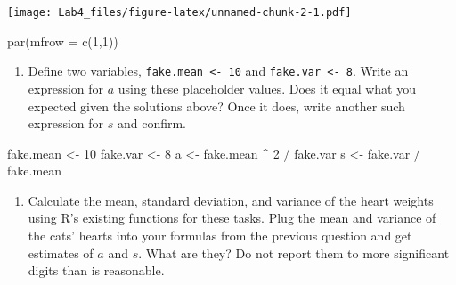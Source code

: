 \documentclass[
]{article}
\newenvironment{Shaded}{\begin{snugshade}}{\end{snugshade}}
\newcommand{\AttributeTok}[1]{\textcolor[rgb]{0.77,0.63,0.00}{#1}}
\newcommand{\DecValTok}[1]{\textcolor[rgb]{0.00,0.00,0.81}{#1}}
\newcommand{\FunctionTok}[1]{\textcolor[rgb]{0.00,0.00,0.00}{#1}}
\newcommand{\NormalTok}[1]{#1}
\newcommand{\OtherTok}[1]{\textcolor[rgb]{0.56,0.35,0.01}{#1}}
\newcommand{\SpecialCharTok}[1]{\textcolor[rgb]{0.00,0.00,0.00}{#1}}
\providecommand{\tightlist}{%
  \setlength{\itemsep}{0pt}\setlength{\parskip}{0pt}}
\begin{document}
\texttt{[image: Lab4\_files/figure-latex/unnamed-chunk-2-1.pdf]}

\begin{Shaded}
\begin{Highlighting}[]
\FunctionTok{par}\NormalTok{(}\AttributeTok{mfrow =} \FunctionTok{c}\NormalTok{(}\DecValTok{1}\NormalTok{,}\DecValTok{1}\NormalTok{))}
\end{Highlighting}
\end{Shaded}

\begin{enumerate}
\def\labelenumi{\arabic{enumi}.}
\setcounter{enumi}{2}
\tightlist
\item
  Define two variables, \texttt{fake.mean\ \textless{}-\ 10} and
  \texttt{fake.var\ \textless{}-\ 8}. Write an expression for \(a\)
  using these placeholder values. Does it equal what you expected given
  the solutions above? Once it does, write another such expression for
  \(s\) and confirm.
\end{enumerate}

\begin{Shaded}
\begin{Highlighting}[]
\NormalTok{fake.mean }\OtherTok{\textless{}{-}} \DecValTok{10}
\NormalTok{fake.var }\OtherTok{\textless{}{-}} \DecValTok{8}
\NormalTok{a }\OtherTok{\textless{}{-}}\NormalTok{ fake.mean }\SpecialCharTok{\^{}} \DecValTok{2} \SpecialCharTok{/}\NormalTok{ fake.var}
\NormalTok{s }\OtherTok{\textless{}{-}}\NormalTok{ fake.var }\SpecialCharTok{/}\NormalTok{ fake.mean}
\end{Highlighting}
\end{Shaded}

\begin{enumerate}
\def\labelenumi{\arabic{enumi}.}
\setcounter{enumi}{3}
\tightlist
\item
  Calculate the mean, standard deviation, and variance of the heart
  weights using R's existing functions for these tasks. Plug the mean
  and variance of the cats' hearts into your formulas from the previous
  question and get estimates of \(a\) and \(s\). What are they? Do not
  report them to more significant digits than is reasonable.
\end{enumerate}

\begin{Shaded}
\end{Shaded}
\end{document}
